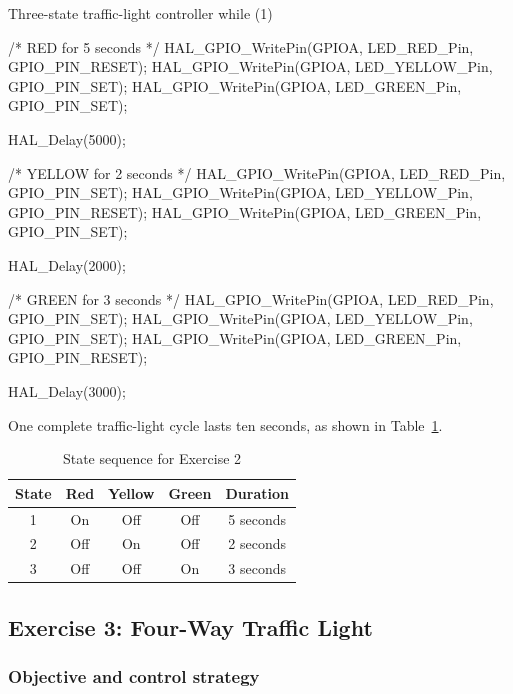 \documentclass[a4paper]{article}
\begin{document}
\begin{stmcode}{Three-state traffic-light controller}
while (1)
{
    /* RED for 5 seconds */
    HAL_GPIO_WritePin(GPIOA, LED_RED_Pin,
                      GPIO_PIN_RESET);
    HAL_GPIO_WritePin(GPIOA, LED_YELLOW_Pin,
                      GPIO_PIN_SET);
    HAL_GPIO_WritePin(GPIOA, LED_GREEN_Pin,
                      GPIO_PIN_SET);

    HAL_Delay(5000);

    /* YELLOW for 2 seconds */
    HAL_GPIO_WritePin(GPIOA, LED_RED_Pin,
                      GPIO_PIN_SET);
    HAL_GPIO_WritePin(GPIOA, LED_YELLOW_Pin,
                      GPIO_PIN_RESET);
    HAL_GPIO_WritePin(GPIOA, LED_GREEN_Pin,
                      GPIO_PIN_SET);

    HAL_Delay(2000);

    /* GREEN for 3 seconds */
    HAL_GPIO_WritePin(GPIOA, LED_RED_Pin,
                      GPIO_PIN_SET);
    HAL_GPIO_WritePin(GPIOA, LED_YELLOW_Pin,
                      GPIO_PIN_SET);
    HAL_GPIO_WritePin(GPIOA, LED_GREEN_Pin,
                      GPIO_PIN_RESET);

    HAL_Delay(3000);
}
\end{stmcode}

One complete traffic-light cycle lasts ten seconds, as shown in
Table~\ref{tab:exercise2-sequence}.

\begin{table}[H]
    \centering
    \caption{State sequence for Exercise 2}
    \label{tab:exercise2-sequence}
    \begin{tabular}{ccccc}
        \toprule
        \textbf{State} & \textbf{Red} & \textbf{Yellow} & \textbf{Green} & \textbf{Duration} \\
        \midrule
        1 & On & Off & Off & 5 seconds \\
        2 & Off & On & Off & 2 seconds \\
        3 & Off & Off & On & 3 seconds \\
        \bottomrule
    \end{tabular}
\end{table}

\subsection{Exercise 3: Four-Way Traffic Light}

\subsubsection{Objective and control strategy}
\end{document}
